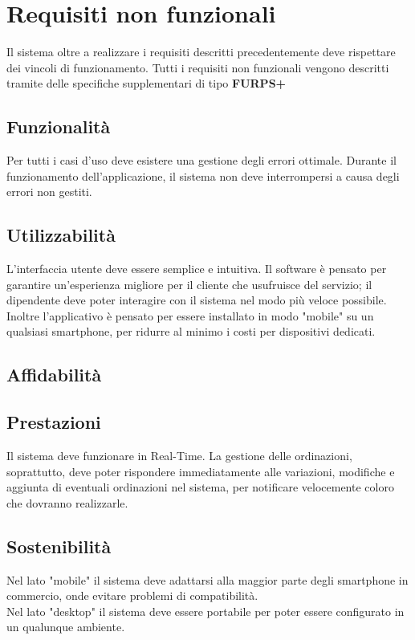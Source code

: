 \section{Requisiti non funzionali}
Il sistema oltre a realizzare i requisiti descritti precedentemente deve rispettare dei vincoli di funzionamento. Tutti i requisiti non funzionali vengono descritti tramite delle specifiche supplementari di tipo \textbf{FURPS+}

\subsection{Funzionalità}
Per tutti i casi d'uso deve esistere una gestione degli errori ottimale. Durante il funzionamento dell'applicazione, il sistema non deve interrompersi a causa degli errori non gestiti.

\subsection{Utilizzabilità}
L'interfaccia utente deve essere semplice e intuitiva. Il software è pensato per garantire un'esperienza migliore per il cliente che usufruisce del servizio; il dipendente deve poter interagire con il sistema nel modo più veloce possibile.
\\Inoltre l'applicativo è pensato per essere installato in modo "mobile" su un qualsiasi smartphone, per ridurre al minimo i costi per dispositivi dedicati.

\subsection{Affidabilità}



\subsection{Prestazioni}
Il sistema deve funzionare in Real-Time. La gestione delle ordinazioni, soprattutto, deve poter rispondere immediatamente alle variazioni, modifiche e aggiunta di eventuali ordinazioni nel sistema, per notificare velocemente coloro che dovranno realizzarle.

\subsection{Sostenibilità}
Nel lato "mobile" il sistema deve adattarsi alla maggior parte degli smartphone in commercio, onde evitare problemi di compatibilità. \\
Nel lato "desktop" il sistema deve essere portabile per poter essere configurato in un qualunque ambiente. 
